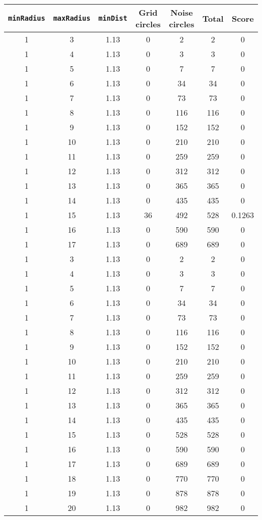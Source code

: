 \documentclass[letterpaper, 12pt]{article}
\begin{document}
\begin{longtable}{|c|c|c|c|c|c|c|}
\hline
\textbf{\texttt{minRadius}} & \textbf{\texttt{maxRadius}} & \textbf{\texttt{minDist}} & \textbf{Grid circles} & \textbf{Noise circles} & \textbf{Total} & \textbf{Score} \\
\hline
1 & 3 & 1.13 & 0 & 2 & 2 & 0 \\
\hline
1 & 4 & 1.13 & 0 & 3 & 3 & 0 \\
\hline
1 & 5 & 1.13 & 0 & 7 & 7 & 0 \\
\hline
1 & 6 & 1.13 & 0 & 34 & 34 & 0 \\
\hline
1 & 7 & 1.13 & 0 & 73 & 73 & 0 \\
\hline
1 & 8 & 1.13 & 0 & 116 & 116 & 0 \\
\hline
1 & 9 & 1.13 & 0 & 152 & 152 & 0 \\
\hline
1 & 10 & 1.13 & 0 & 210 & 210 & 0 \\
\hline
1 & 11 & 1.13 & 0 & 259 & 259 & 0 \\
\hline
1 & 12 & 1.13 & 0 & 312 & 312 & 0 \\
\hline
1 & 13 & 1.13 & 0 & 365 & 365 & 0 \\
\hline
1 & 14 & 1.13 & 0 & 435 & 435 & 0 \\
\hline
1 & 15 & 1.13 & 36 & 492 & 528 & 0.1263 \\
\hline
1 & 16 & 1.13 & 0 & 590 & 590 & 0 \\
\hline
1 & 17 & 1.13 & 0 & 689 & 689 & 0 \\
\hline
1 & 3 & 1.13 & 0 & 2 & 2 & 0 \\
\hline
1 & 4 & 1.13 & 0 & 3 & 3 & 0 \\
\hline
1 & 5 & 1.13 & 0 & 7 & 7 & 0 \\
\hline
1 & 6 & 1.13 & 0 & 34 & 34 & 0 \\
\hline
1 & 7 & 1.13 & 0 & 73 & 73 & 0 \\
\hline
1 & 8 & 1.13 & 0 & 116 & 116 & 0 \\
\hline
1 & 9 & 1.13 & 0 & 152 & 152 & 0 \\
\hline
1 & 10 & 1.13 & 0 & 210 & 210 & 0 \\
\hline
1 & 11 & 1.13 & 0 & 259 & 259 & 0 \\
\hline
1 & 12 & 1.13 & 0 & 312 & 312 & 0 \\
\hline
1 & 13 & 1.13 & 0 & 365 & 365 & 0 \\
\hline
1 & 14 & 1.13 & 0 & 435 & 435 & 0 \\
\hline
1 & 15 & 1.13 & 0 & 528 & 528 & 0 \\
\hline
1 & 16 & 1.13 & 0 & 590 & 590 & 0 \\
\hline
1 & 17 & 1.13 & 0 & 689 & 689 & 0 \\
\hline
1 & 18 & 1.13 & 0 & 770 & 770 & 0 \\
\hline
1 & 19 & 1.13 & 0 & 878 & 878 & 0 \\
\hline
1 & 20 & 1.13 & 0 & 982 & 982 & 0 \\
\hline
\end{longtable}
\end{document}
